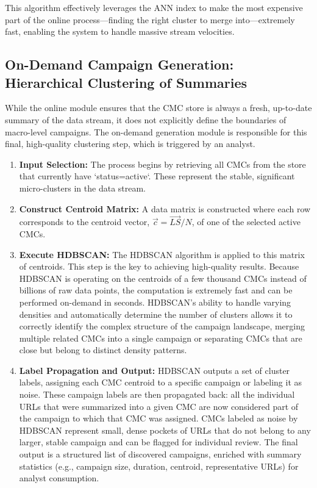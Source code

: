 \documentclass[journal,article,submit,pdftex,moreauthors]{Definitions/mdpi}
\begin{document}
This algorithm effectively leverages the ANN index to make the most expensive part of the online process—finding the right cluster to merge into—extremely fast, enabling the system to handle massive stream velocities.

\subsection{On-Demand Campaign Generation: Hierarchical Clustering of Summaries}

While the online module ensures that the CMC store is always a fresh, up-to-date summary of the data stream, it does not explicitly define the boundaries of macro-level campaigns. The on-demand generation module is responsible for this final, high-quality clustering step, which is triggered by an analyst.

\begin{enumerate}
    \item \textbf{Input Selection:} The process begins by retrieving all CMCs from the store that currently have `status=active`. These represent the stable, significant micro-clusters in the data stream.
    \item \textbf{Construct Centroid Matrix:} A data matrix is constructed where each row corresponds to the centroid vector, $\vec{c} = \vec{LS}/N$, of one of the selected active CMCs.
    \item \textbf{Execute HDBSCAN:} The HDBSCAN algorithm is applied to this matrix of centroids. This step is the key to achieving high-quality results. Because HDBSCAN is operating on the centroids of a few thousand CMCs instead of billions of raw data points, the computation is extremely fast and can be performed on-demand in seconds. HDBSCAN's ability to handle varying densities and automatically determine the number of clusters allows it to correctly identify the complex structure of the campaign landscape, merging multiple related CMCs into a single campaign or separating CMCs that are close but belong to distinct density patterns.
    \item \textbf{Label Propagation and Output:} HDBSCAN outputs a set of cluster labels, assigning each CMC centroid to a specific campaign or labeling it as noise. These campaign labels are then propagated back: all the individual URLs that were summarized into a given CMC are now considered part of the campaign to which that CMC was assigned. CMCs labeled as noise by HDBSCAN represent small, dense pockets of URLs that do not belong to any larger, stable campaign and can be flagged for individual review. The final output is a structured list of discovered campaigns, enriched with summary statistics (e.g., campaign size, duration, centroid, representative URLs) for analyst consumption.
\end{enumerate}
\end{document}
